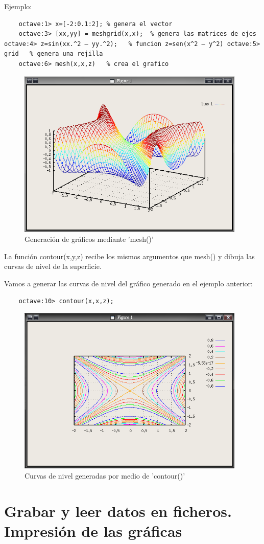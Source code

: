 \documentclass[a4,12pt]{article}
\begin{document}
Ejemplo:\\
\begin{verbatim}
	octave:1> x=[-2:0.1:2];	% genera el vector
	octave:3> [xx,yy] = meshgrid(x,x);	% genera las matrices de ejes octave:4> z=sin(xx.^2 – yy.^2);	% funcion z=sen(x^2 – y^2) octave:5> grid	% genera una rejilla
	octave:6> mesh(x,x,z)	% crea el grafico
\end{verbatim}
\begin{figure}[H]
  \centering
    \includegraphics{graficos/imagen5}
  \caption{Generación de gráficos mediante 'mesh()'}
\end{figure}

La función contour(x,y,z) recibe los mismos argumentos que mesh() y dibuja las curvas de nivel de la superficie.

Vamos a generar las curvas de nivel del gráfico generado en el ejemplo anterior:

\begin{verbatim}
	octave:10> contour(x,x,z);
\end{verbatim}
\begin{figure}[H]
  \centering
    \includegraphics{graficos/imagen6}
  \caption{Curvas de nivel generadas por medio de 'contour()'}
\end{figure}

\section{Grabar y leer datos en ficheros. Impresión de las gráficas}
\end{document}
